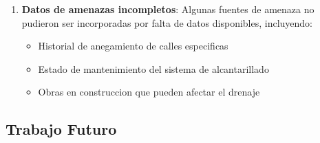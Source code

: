 \documentclass[conference]{IEEEtran}
\begin{document}
\begin{enumerate}
    \item \textbf{Datos de amenazas incompletos}: Algunas fuentes de amenaza no pudieron ser incorporadas por falta de datos disponibles, incluyendo:
    \begin{itemize}
        \item Historial de anegamiento de calles especificas
        \item Estado de mantenimiento del sistema de alcantarillado
        \item Obras en construccion que pueden afectar el drenaje
    \end{itemize}
\end{enumerate}

\subsection{Trabajo Futuro}
\end{document}
